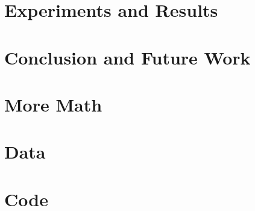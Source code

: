 \documentclass[12pt,twosided]{report}
\begin{document}
\chapter{Experiments and Results}
\label{chap:results}


\chapter{Conclusion and Future Work}
\label{chap:outro}


\begin{appendices}


  
\chapter{More Math}


\chapter{Data}


\chapter{Code}

\end{appendices}

\printbibliography[heading=bibintoc,title={References}]
\end{document}
